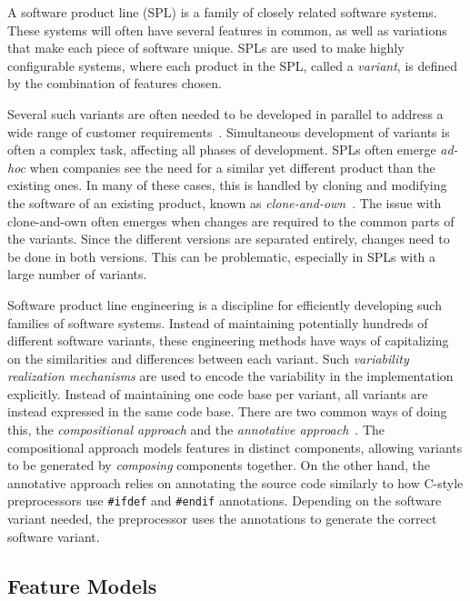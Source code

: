 \documentclass[a4paper,english]{ifimaster}
\begin{document}
A software product line (SPL) is a family of closely related software systems. These systems will often have several features in common, as well as variations that make each piece of software unique. SPLs are used to make highly configurable systems, where each product in the SPL, called a \textit{variant}, is defined by the combination of features chosen.

Several such variants are often needed to be developed in parallel to address a wide range of customer requirements~\cite{cite:software_diversity_ina}. Simultaneous development of variants is often a complex task, affecting all phases of development. SPLs often emerge \textit{ad-hoc} when companies see the need for a similar yet different product than the existing ones. In many of these cases, this is handled by cloning and modifying the software of an existing product, known as \textit{clone-and-own}~\cite{cite:clone_and_own}. The issue with clone-and-own often emerges when changes are required to the common parts of the variants. Since the different versions are separated entirely, changes need to be done in both versions. This can be problematic, especially in SPLs with a large number of variants.

Software product line engineering is a discipline for efficiently developing such families of software systems. Instead of maintaining potentially hundreds of different software variants, these engineering methods have ways of capitalizing on the similarities and differences between each variant. Such \textit{variability realization mechanisms} are used to encode the variability in the implementation explicitly. Instead of maintaining one code base per variant, all variants are instead expressed in the same code base. There are two common ways of doing this, the \textit{compositional approach} and the \textit{annotative approach}~\cite{cite:granularity_in_spl}. The compositional approach models features in distinct components, allowing variants to be generated by \textit{composing} components together. On the other hand, the annotative approach relies on annotating the source code similarly to how C-style preprocessors use \texttt{\#ifdef} and \texttt{\#endif} annotations. Depending on the software variant needed, the preprocessor uses the annotations to generate the correct software variant.

\subsection{Feature Models}%
\label{sub:feature_models}
\end{document}
